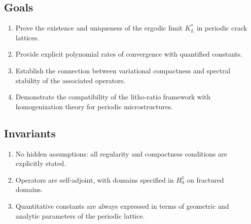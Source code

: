 \subsection*{Goals}
\begin{enumerate}[label=G\arabic*]
  \item Prove the existence and uniqueness of the ergodic limit $K_L^*$ in 
  periodic crack lattices.
  \item Provide explicit polynomial rates of convergence with quantified constants.
  \item Establish the connection between variational compactness 
  and spectral stability of the associated operators.
  \item Demonstrate the compatibility of the litho-ratio framework with 
  homogenization theory for periodic microstructures.
\end{enumerate}

\subsection*{Invariants}
\begin{enumerate}[label=I\arabic*]
  \item No hidden assumptions: all regularity and compactness conditions 
  are explicitly stated.
  \item Operators are self-adjoint, with domains specified in $H^1_0$ 
  on fractured domains.
  \item Quantitative constants are always expressed in terms of geometric
  and analytic parameters of the periodic lattice.
\end{enumerate}

